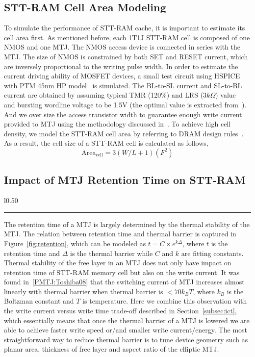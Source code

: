 \subsection{STT-RAM Cell Area Modeling}
To simulate the performance of STT-RAM cache, it is important to estimate its cell area first. As mentioned before, each 1T1J STT-RAM cell is composed of one NMOS and one MTJ. The NMOS access device is connected in series with the MTJ. The size of NMOS is constrained by both SET and RESET current, which are inversely proportional to the writing pulse width. In order to estimate the current driving ability of MOSFET devices, a small test circuit using HSPICE with PTM 45nm HP model~\cite{PTM} is simulated. The BL-to-SL current and SL-to-BL current are obtained by assuming typical TMR (120\%) and LRS ($3k\Omega$) value~\cite{STTRAM:Qualcomm09} and bursting wordline voltage to be 1.5V (the optimal value is extracted from~\cite{STTRAM:Gatech10}). And we over size the access transistor width to guarantee enough write current provided to MTJ using the methodology discussed in~\cite{STTRAM:RPI10}. To achieve high cell density, we model the STT-RAM cell area by referring to DRAM design rules~\cite{DRAM:6F2}.  As a result, the cell size of a STT-RAM cell is calculated as follows,
\begin{equation}
\mathrm{Area}_{\mathrm{cell}}={3\left(W/L+1\right)}(F^2)
\end{equation}

\subsection{Impact of MTJ Retention Time on STT-RAM} \label{subsec:retention}
\begin{wrapfigure}{l}{0.50\textwidth}
\centering
 \hrule
 \caption{\label{fig:retention} \scriptsize \bf MTJ thermal stability requirement for different retention time}
\end{wrapfigure}

The retention time of a MTJ is largely determined by the thermal stability of the MTJ. The relation between retention time and thermal barrier is captured in Figure~\ref{fig:retention}, which can be modeled as $t=C\times e^{k\Delta}$, where $t$ is the retention time and $\Delta$ is the thermal barrier while $C$ and $k$ are fitting constants. Thermal stability of the free layer in an MTJ does not only have impact on retention time of STT-RAM memory cell but also on the write current. It was found in~\ref{PMTJ:Toshiba08} that the switching current of MTJ increases almost linearly with thermal barrier when thermal barrier is $<70k_{B}T$, where $k_{B}$ is the Boltzman constant and $T$ is temperature. Here we combine this observation with the write current versus write time trade-off described in Section~\ref{subsec:ict}, which essentially means that once the thermal barrier of a MTJ is lowered we are able to achieve faster write speed or/and smaller write current/energy. The most straightforward way to reduce thermal barrier is to tune device geometry such as planar area, thickness of free layer and aspect ratio of the elliptic MTJ.

